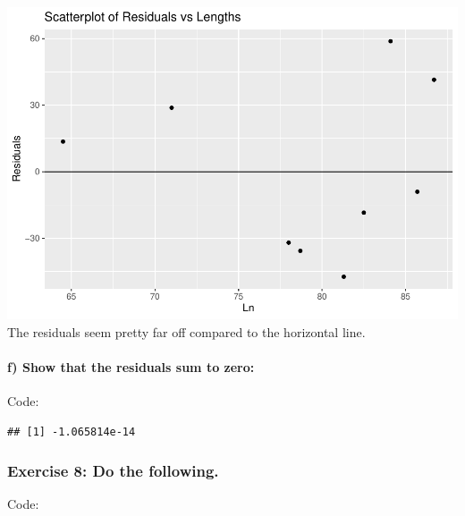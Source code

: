 \documentclass[
]{article}
\newenvironment{Shaded}{\begin{snugshade}}{\end{snugshade}}
\newcommand{\FunctionTok}[1]{\textcolor[rgb]{0.00,0.00,0.00}{#1}}
\newcommand{\NormalTok}[1]{#1}
\newcommand{\SpecialCharTok}[1]{\textcolor[rgb]{0.00,0.00,0.00}{#1}}
\begin{document}
\includegraphics{Class_Exercises_ClassNotes_5_files/figure-latex/unnamed-chunk-30-1.pdf}
The residuals seem pretty far off compared to the horizontal line.

\hypertarget{f-show-that-the-residuals-sum-to-zero}{%
\paragraph{f) Show that the residuals sum to
zero:}\label{f-show-that-the-residuals-sum-to-zero}}

\hfill\break
Code:

\begin{Shaded}
\end{Shaded}

\begin{verbatim}
## [1] -1.065814e-14
\end{verbatim}

\newpage

\hypertarget{exercise-8-do-the-following.}{%
\subsubsection{Exercise 8: Do the
following.}\label{exercise-8-do-the-following.}}

\hfill\break
Code:
\end{document}

